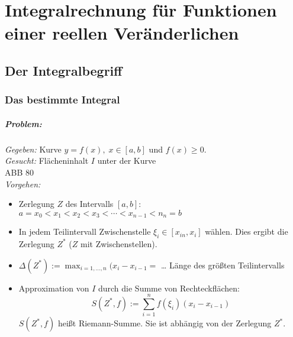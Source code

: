 \chapter{Integralrechnung für Funktionen einer reellen Veränderlichen}
\section{Der Integralbegriff}
\subsection{Das bestimmte Integral}
\paragraph{Problem:} \parskp
\emph{Gegeben:} Kurve $y=f(x), \;x\in [a,b]$ und $f(x) \geq 0$.\\
\emph{Gesucht:} Flächeninhalt $I$ unter der Kurve\\
ABB 80\\
\emph{Vorgehen:} 
\begin{itemize}
\item Zerlegung $Z$ des Intervalls $[a,b]$:\\
$a=x_0<x_1<x_2<x_3<\dotsb<x_{n-1}<n_n=b$
\item In jedem Teilintervall Zwischenstelle $\xi_i\in [x_{in}, x_i]$ wählen. Dies ergibt die Zerlegung $Z^*$ ($Z$ mit Zwischenstellen).
\item $\Delta (Z^*):= \max_{i=1,\dots, n}(x_i-x_{i-1}=$ … Länge des größten Teilintervalls
\item Approximation von $I$ durch die Summe von Rechteckflächen: $$S(Z^*,f):=\sum_{i=1}^n f(\xi_i)(x_i-x_{i-1})$$
$S(Z^*,f)$ heißt Riemann-Summe. Sie ist abhängig von der Zerlegung $Z^*$.
\end{itemize}
